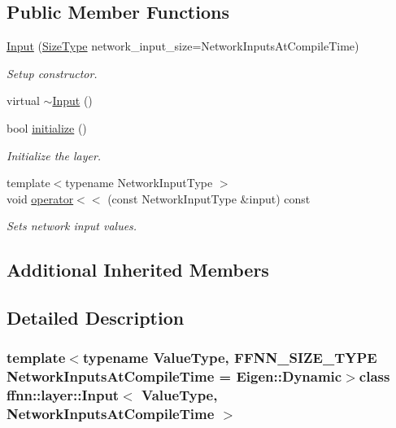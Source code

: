 \subsection*{Public Member Functions}
\begin{DoxyCompactItemize}
\item 
\hyperlink{classffnn_1_1layer_1_1_input_af113b95968a3c2fc28ddf6bfd735038f}{Input} (\hyperlink{classffnn_1_1layer_1_1_input_a0d5acc89e0b0ad61f148c18325fb46f4}{Size\-Type} network\-\_\-input\-\_\-size=Network\-Inputs\-At\-Compile\-Time)
\begin{DoxyCompactList}\small\item\em Setup constructor. \end{DoxyCompactList}\item 
virtual \hyperlink{classffnn_1_1layer_1_1_input_a13d4e0701fb7ba0881cb3fdc9238adb2}{$\sim$\-Input} ()
\item 
bool \hyperlink{classffnn_1_1layer_1_1_input_ac3de713973a8f67dc348a088ab6dbe1c}{initialize} ()
\begin{DoxyCompactList}\small\item\em Initialize the layer. \end{DoxyCompactList}\item 
{\footnotesize template$<$typename Network\-Input\-Type $>$ }\\void \hyperlink{classffnn_1_1layer_1_1_input_a66b1272c6ed66097bf08c6d2058888cb}{operator$<$$<$} (const Network\-Input\-Type \&input) const 
\begin{DoxyCompactList}\small\item\em Sets network input values. \end{DoxyCompactList}\end{DoxyCompactItemize}
\subsection*{Additional Inherited Members}


\subsection{Detailed Description}
\subsubsection*{template$<$typename Value\-Type, F\-F\-N\-N\-\_\-\-S\-I\-Z\-E\-\_\-\-T\-Y\-P\-E Network\-Inputs\-At\-Compile\-Time = Eigen\-::\-Dynamic$>$class ffnn\-::layer\-::\-Input$<$ Value\-Type, Network\-Inputs\-At\-Compile\-Time $>$}

